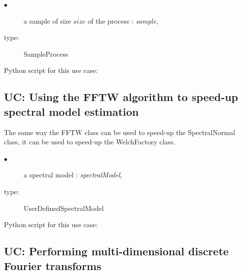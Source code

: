 {
  \begin{description}
  \item[$\bullet$] a sample of size $size$ of the process : {\itshape sample},
  \item[type:] SampleProcess
  \end{description}
}
\espace

Python script for this use case:



\subsection{UC: Using the FFTW algorithm to speed-up spectral model estimation} \label{FFTWWelchFactory}

The same way the FFTW class can be used to speed-up the SpectralNormal class, it can be used to speed-up the WelchFactory class.

{
  \begin{description}
  \item[$\bullet$] a spectral model : {\itshape spectralModel},
  \item[type:] UserDefinedSpectralModel
  \end{description}
}
\espace

Python script for this use case:



\subsection{UC: Performing multi-dimensional discrete Fourier transforms} \label{FFTWND}

